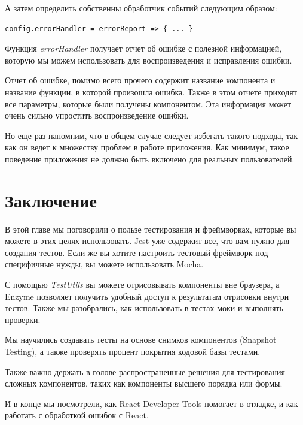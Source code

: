 А затем определить собственны обработчик событий следующим образом:

\begin{lstlisting}
config.errorHandler = errorReport => { ... }
\end{lstlisting}

Функция \textit{errorHandler} получает отчет об ошибке с полезной информацией, которую мы можем использовать для воспроизведения и исправления ошибки.

Отчет об ошибке, помимо всего прочего содержит название компонента и название функции, в которой произошла ошибка. Также в этом отчете приходят все параметры, которые были получены компонентом. Эта информация может очень сильно упростить воспроизведение ошибки.

Но еще раз напомним, что в общем случае следует избегать такого подхода, так как он ведет к множеству проблем в работе приложения. Как минимум, такое поведение приложения не должно быть включено для реальных пользователей.


\section{Заключение}

В этой главе мы поговорили о пользе тестирования и фреймворках, которые вы можете в этих целях использовать. Jest уже содержит все, что вам нужно для создания тестов. Если же вы хотите настроить тестовый фреймворк под специфичные нужды, вы можете использовать Mocha.

С помощью \textit{TestUtils} вы можете отрисовывать компоненты вне браузера, а Enzyme позволяет получить удобный доступ к результатам отрисовки внутри тестов. Также мы разобрались, как использовать в тестах моки и выполнять проверки.

Мы научились создавать тесты на основе снимков компонентов (Snapshot Testing), а также проверять процент покрытия кодовой базы тестами.

Также важно держать в голове распространенные решения для тестирования сложных компонентов, таких как компоненты высшего порядка или формы.

И в конце мы посмотрели, как React Developer Tools помогает в отладке, и как работать с обработкой ошибок с React.













